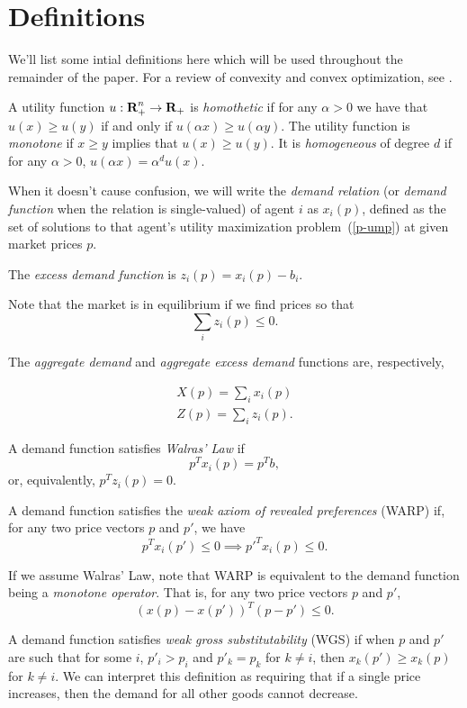 \documentclass{article}
\begin{document}
\section{Definitions}
We'll list some intial definitions here which will be used throughout the remainder of the paper.
For a review of convexity and convex optimization, see
\cite{boyd2009convex}.

A utility function $u: {\mbox{\bf R}}^n_+ \to {\mbox{\bf R}}_+$ is \emph{homothetic} if for any $\alpha > 0$ we have that $u(x) \geq u(y)$ if and only if
$u(\alpha x) \geq u(\alpha y)$.
The utility function is \emph{monotone} if $x \geq y$ implies that $u(x) \geq u(y)$.
It is \emph{homogeneous} of degree $d$ if for any $\alpha > 0$,
$u(\alpha x) = \alpha^d u(x)$.

When it doesn't cause confusion, we will write the \emph{demand relation} (or \emph{demand function}
when the relation is single-valued) of agent $i$ as $x_i(p)$, defined as the set of solutions to that agent's
utility maximization problem~(\ref{p-ump}) at given market prices $p$.

The \emph{excess demand function} is $z_i(p) = x_i(p) - b_i$.

Note that the market is in equilibrium if we find prices so that
\[
\sum_i z_i(p) \leq 0.
\]

The \emph{aggregate demand} and \emph{aggregate excess demand} functions are,
respectively,

\begin{align*}
X(p) = \sum_i x_i(p)\\
Z(p) = \sum_i z_i(p).
\end{align*}

A demand function satisfies \emph{Walras' Law} if
\[
p^T x_i(p) = p^T b,
\]
or, equivalently, $p^T z_i(p) = 0$.

A demand function satisfies the \emph{weak axiom of revealed preferences}
(WARP) if, for any two price vectors $p$ and $p'$, we have
\[
p^T x_i(p') \leq 0 \implies p'^T x_i(p) \leq 0.
\]

If we assume Walras' Law, note that WARP is equivalent to the demand function
being a \emph{monotone operator}. That is, for any two price vectors $p$ and $p'$,
\[
\left(x(p) - x(p')\right)^T (p - p') \leq 0.
\]

A demand function satisfies \emph{weak gross substitutability} (WGS)
if when $p$ and $p'$ are such that for some $i$, $p'_i > p_i$ and
$p'_k = p_k$ for $k \neq i$, then $x_k(p') \geq x_k(p)$ for $k \neq i$.
We can interpret this definition as requiring that if a single price increases,
then the demand for all other goods cannot decrease.
\end{document}
